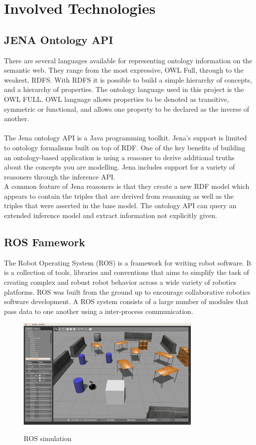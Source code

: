 
\section{Involved Technologies}

\subsection{JENA Ontology API}
There are several languages available for representing ontology information on the semantic web. They range from the most expressive, OWL Full, through to the weakest, RDFS. With RDFS it is possible to build a simple hierarchy of concepts, and a hierarchy of properties. The ontology language used in this project is the OWL FULL. OWL language allows properties to be denoted as transitive, symmetric or functional, and allows one property to be declared as the inverse of another.\\
\\
The Jena ontology API is a Java programming toolkit. Jena's support is limited to ontology formalisms built on top of RDF. One of the key benefits of building an ontology-based application is using a reasoner to derive additional truths about the concepts you are modelling. Jena includes support for a variety of reasoners through the inference API.
\\
A common feature of Jena reasoners is that they create a new RDF model which appears to contain the triples that are derived from reasoning as well as the triples that were asserted in the base model. The ontology API can query an extended inference model and extract information not explicitly given.

\subsection{ROS Famework}
The Robot Operating System (ROS) is a framework  for writing robot software. It is a collection of tools, libraries and conventions that aims to simplify the task of creating complex and robust robot behavior across a wide variety of robotics platforms. 
ROS was built from the ground up to encourage collaborative robotics software development. A ROS system consists of a large number of modules that pass data to one another using a inter-process communication.
\\
\begin{figure}[H]
\centering
\includegraphics[width=0.8\textwidth]{imgs/gazebo1.png}
\label{fig:gazebo1}
\caption{ROS simulation}
\end{figure}

